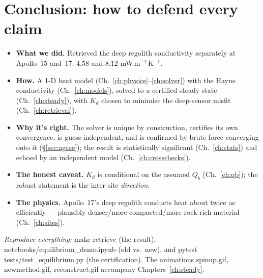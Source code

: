 \documentclass[11pt]{report}
\newcommand{\code}[1]{{\ttfamily\small #1}}
\begin{document}
\chapter{Conclusion: how to defend every claim}\label{ch:conclusion}
\begin{itemize}[leftmargin=1.5em,itemsep=3pt]
\item \textbf{What we did.} Retrieved the deep regolith conductivity separately at
Apollo~15 and~17: $4.58$ and $8.12$ mW\,m$^{-1}$\,K$^{-1}$.
\item \textbf{How.} A 1-D heat model (Ch.~\ref{ch:physics}--\ref{ch:solver}) with
the Hayne conductivity (Ch.~\ref{ch:models}), solved to a certified steady state
(Ch.~\ref{ch:steady}), with $K_d$ chosen to minimise the deep-sensor misfit
(Ch.~\ref{ch:retrieval}).
\item \textbf{Why it's right.} The solver is unique by construction, certifies its
own convergence, is guess-independent, and is confirmed by brute force converging
onto it (\S\ref{sec:agree}); the result is statistically significant
(Ch.~\ref{ch:stats}) and echoed by an independent model (Ch.~\ref{ch:crosschecks}).
\item \textbf{The honest caveat.} $K_d$ is conditional on the assumed $Q_b$
(Ch.~\ref{ch:qb}); the robust statement is the inter-site \emph{direction}.
\item \textbf{The physics.} Apollo~17's deep regolith conducts heat about twice as
efficiently --- plausibly denser/more compacted/more rock-rich material
(Ch.~\ref{ch:sites}).
\end{itemize}

\vspace{4pt}
\noindent\textit{Reproduce everything:} \code{make retrieve} (the result),
\code{notebooks/equilibrium\_demo.ipynb} (old vs.\ new), and
\code{pytest tests/test\_equilibrium.py} (the certification). The animations
\code{spinup.gif}, \code{newmethod.gif}, \code{reconstruct.gif} accompany
Chapters~\ref{ch:steady}.
\end{document}
